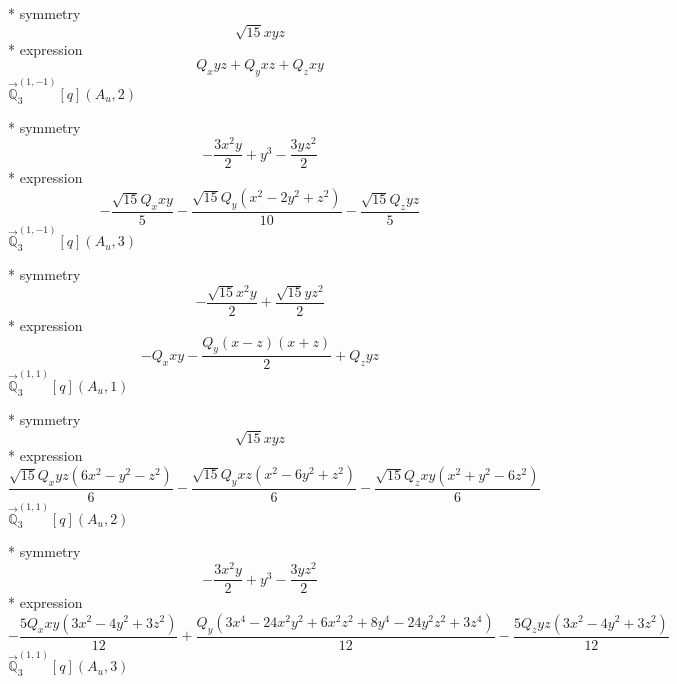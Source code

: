 \documentclass[fleqn,8pt]{jsarticle}
\begin{document}
\noindent\quad ** symmetry
\begin{dmath*}
\sqrt{15} x y z
\end{dmath*}
\noindent\quad ** expression
\begin{dmath*}
Q_{x} y z + Q_{y} x z + Q_{z} x y
\end{dmath*}
\noindent\quad $\vec{\mathbb{Q}}_{3}^{(1,-1)}[q](A_{u},2)$

\noindent\quad ** symmetry
\begin{dmath*}
- \frac{3 x^{2} y}{2} + y^{3} - \frac{3 y z^{2}}{2}
\end{dmath*}
\noindent\quad ** expression
\begin{dmath*}
- \frac{\sqrt{15} Q_{x} x y}{5} - \frac{\sqrt{15} Q_{y} \left(x^{2} - 2 y^{2} + z^{2}\right)}{10} - \frac{\sqrt{15} Q_{z} y z}{5}
\end{dmath*}
\noindent\quad $\vec{\mathbb{Q}}_{3}^{(1,-1)}[q](A_{u},3)$

\noindent\quad ** symmetry
\begin{dmath*}
- \frac{\sqrt{15} x^{2} y}{2} + \frac{\sqrt{15} y z^{2}}{2}
\end{dmath*}
\noindent\quad ** expression
\begin{dmath*}
- Q_{x} x y - \frac{Q_{y} \left(x - z\right) \left(x + z\right)}{2} + Q_{z} y z
\end{dmath*}
\noindent\quad $\vec{\mathbb{Q}}_{3}^{(1,1)}[q](A_{u},1)$

\noindent\quad ** symmetry
\begin{dmath*}
\sqrt{15} x y z
\end{dmath*}
\noindent\quad ** expression
\begin{dmath*}
\frac{\sqrt{15} Q_{x} y z \left(6 x^{2} - y^{2} - z^{2}\right)}{6} - \frac{\sqrt{15} Q_{y} x z \left(x^{2} - 6 y^{2} + z^{2}\right)}{6} - \frac{\sqrt{15} Q_{z} x y \left(x^{2} + y^{2} - 6 z^{2}\right)}{6}
\end{dmath*}
\noindent\quad $\vec{\mathbb{Q}}_{3}^{(1,1)}[q](A_{u},2)$

\noindent\quad ** symmetry
\begin{dmath*}
- \frac{3 x^{2} y}{2} + y^{3} - \frac{3 y z^{2}}{2}
\end{dmath*}
\noindent\quad ** expression
\begin{dmath*}
- \frac{5 Q_{x} x y \left(3 x^{2} - 4 y^{2} + 3 z^{2}\right)}{12} + \frac{Q_{y} \left(3 x^{4} - 24 x^{2} y^{2} + 6 x^{2} z^{2} + 8 y^{4} - 24 y^{2} z^{2} + 3 z^{4}\right)}{12} - \frac{5 Q_{z} y z \left(3 x^{2} - 4 y^{2} + 3 z^{2}\right)}{12}
\end{dmath*}
\noindent\quad $\vec{\mathbb{Q}}_{3}^{(1,1)}[q](A_{u},3)$
\end{document}
